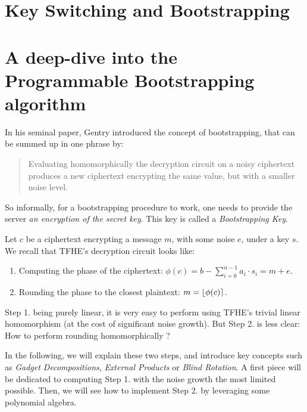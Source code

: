 \section{Key Switching and Bootstrapping}







\section{A deep-dive into the Programmable Bootstrapping algorithm}

In his seminal paper, Gentry introduced the concept of bootstrapping, that can be summed up in one phrase by:

\begin{quote}
	Evaluating homomorphically the decryption circuit on a noisy ciphertext produces a new ciphertext encrypting the same value, but with a smaller noise level.
\end{quote}

So informally, for a bootstrapping procedure to work, one needs to provide the server \textit{an encryption of the secret key}. This key is called a \textit{Bootstrapping Key}.



Let $c$ be a ciphertext encrypting a message $m$, with some noise $e$, under a key $s$. We recall that TFHE's decryption circuit looks like:

\begin{enumerate}
	\item Computing the phase of the ciphertext: $\phi(c) = b - \sum_{i=0}^{n-1} a_i \cdot s_i = m + e$.
	\item Rounding the phase to the closest plaintext: $m = \left \lfloor \phi(c) \right \rceil$.
\end{enumerate}


Step 1. being purely linear, it is very easy to perform using TFHE's trivial linear homomorphism (at the cost of significant noise growth). But Step 2. is less clear: How to perform rounding homomorphically ? 

In the following, we will explain these two steps, and introduce key concepts such as \textit{Gadget Decompositions}, \textit{External Products} or \textit{Blind Rotation}. A first piece will be dedicated to computing Step 1. with the noise growth the most limited possible. Then, we will see how to implement Step 2. by leveraging some polynomial algebra.

